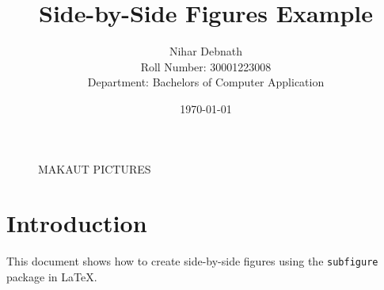\documentclass{article}
\begin{document}
\title{Side-by-Side Figures Example}
\author{Nihar Debnath \\ Roll Number: 30001223008 \\ Department: Bachelors of Computer Application}
\date{\today}
\maketitle

\begin{figure}[htbp]
    \centering
    \hfill
    \caption{MAKAUT PICTURES}
    \label{fig:sidebyside}
\end{figure}

\section{Introduction}
This document shows how to create side-by-side figures using the \texttt{subfigure} package in LaTeX. 
\end{document}
